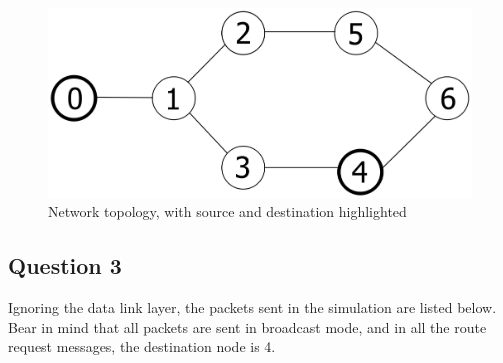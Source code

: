 \documentclass[11pt,journal]{article}
\begin{document}
	\begin{figure}[h]
		\centering
		\includegraphics[scale=0.6]{lab4i_topology.png}
		\caption{Network topology, with source and destination highlighted}
	\end{figure}

	\subsection{Question 3}
	Ignoring the data link layer, the packets sent in the simulation are listed below. Bear in mind that all packets are sent in broadcast mode, and in all the route request messages, the destination node is 4.
	
\end{document}
